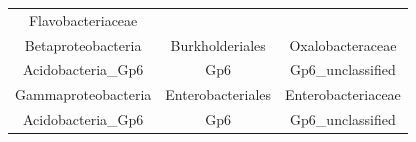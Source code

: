 \documentclass[]{article}
\begin{document}
\begin{longtable}[]{@{}ccc@{}}
\begin{minipage}[t]{0.25\columnwidth}
Flavobacteriaceae\strut
\end{minipage}\tabularnewline
\begin{minipage}[t]{0.28\columnwidth}\centering\strut
Betaproteobacteria\strut
\end{minipage} & \begin{minipage}[t]{0.25\columnwidth}\centering\strut
Burkholderiales\strut
\end{minipage} & \begin{minipage}[t]{0.25\columnwidth}\centering\strut
Oxalobacteraceae\strut
\end{minipage}\tabularnewline
\begin{minipage}[t]{0.28\columnwidth}\centering\strut
Acidobacteria\_Gp6\strut
\end{minipage} & \begin{minipage}[t]{0.25\columnwidth}\centering\strut
Gp6\strut
\end{minipage} & \begin{minipage}[t]{0.25\columnwidth}\centering\strut
Gp6\_unclassified\strut
\end{minipage}\tabularnewline
\begin{minipage}[t]{0.28\columnwidth}\centering\strut
Gammaproteobacteria\strut
\end{minipage} & \begin{minipage}[t]{0.25\columnwidth}\centering\strut
Enterobacteriales\strut
\end{minipage} & \begin{minipage}[t]{0.25\columnwidth}\centering\strut
Enterobacteriaceae\strut
\end{minipage}\tabularnewline
\begin{minipage}[t]{0.28\columnwidth}\centering\strut
Acidobacteria\_Gp6\strut
\end{minipage} & \begin{minipage}[t]{0.25\columnwidth}\centering\strut
Gp6\strut
\end{minipage} & \begin{minipage}[t]{0.25\columnwidth}\centering\strut
Gp6\_unclassified\strut
\end{minipage}\tabularnewline
\bottomrule
\end{longtable}
\end{document}
